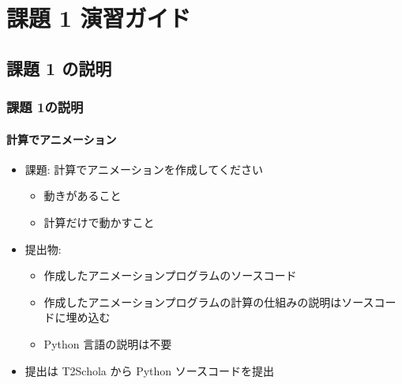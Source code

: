 %
%
\section{課題 1 演習ガイド}
\subsection{課題 1 の説明}
\begin{frame}
\frametitle{課題 1の説明}
\framesubtitle{計算でアニメーション}
  \begin{itemize}
\item 課題: 計算でアニメーションを作成してください
    \begin{itemize}
\item 動きがあること
\item 計算だけで動かすこと
    \end{itemize}
\item 提出物:
    \begin{itemize}
\item 作成したアニメーションプログラムのソースコード
\item 作成したアニメーションプログラムの計算の仕組みの説明はソースコードに埋め込む
\item Python 言語の説明は不要
    \end{itemize}
\item 提出は T2Schola から Python ソースコードを提出
  \end{itemize}
\end{frame}
%
